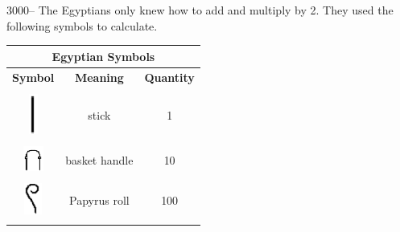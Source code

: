 \documentclass[letterpaper, 12pt]{article}
\begin{document}
3000-- The Egyptians only knew how to add and multiply by 2. They used the following symbols to calculate.\\

\begin{center}
\begin{tabular}{|c|c|c|}
\multicolumn{3}{c}{\bf Egyptian Symbols}\\[2mm] \hline
{\bf Symbol} & {\bf Meaning} & {\bf Quantity}  \\ \hline \hline
 & & \\
\includegraphics[scale=0.8]{Hiero1.eps} & stick & 1\\[4mm] \hline
 & & \\
\includegraphics[scale=1.6]{Hiero10.eps} & basket handle & 10\\[4mm] \hline
 & & \\
\includegraphics[scale=1.5]{Hiero100.eps} & Papyrus roll & 100\\[4mm] \hline
 & & \\

\end{tabular}
\end{center}
\end{document}
